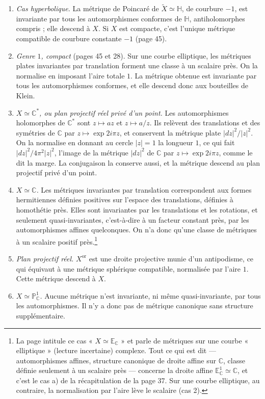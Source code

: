 \documentclass[11pt,a4paper]{article}
\begin{document}
\begin{enumerate}
  \item \emph{Cas hyperbolique.} La métrique de Poincaré de $\widetilde{X}
  \simeq \mathbb{H}$, de courbure $-1$, est invariante par tous les
  automorphismes conformes de $\mathbb{H}$, antiholomorphes compris ; elle
  descend à $X$. Si $X$ est compacte, c'est l'unique métrique compatible de
  courbure constante $-1$ (page 45).
  \item \emph{Genre $1$, compact} (pages 45 et 28). Sur une courbe elliptique,
  les métriques plates invariantes par translation forment une classe à un
  scalaire près. On la normalise en imposant l'aire totale $1$. La métrique
  obtenue est invariante par tous les automorphismes conformes, et elle
  descend donc aux bouteilles de Klein.
  \item[2')] \emph{$X \simeq \mathbb{C}^{*}$, ou plan projectif réel privé d'un
  point.} Les automorphismes holomorphes de $\mathbb{C}^{*}$ sont
  $z \mapsto az$ et $z \mapsto a/z$. Ils relèvent des translations et des
  symétries de $\mathbb{C}$ par $z \mapsto \exp 2i\pi z$, et conservent la
  métrique plate $|dz|^{2}/|z|^{2}$. On la normalise en donnant au cercle
  $|z| = 1$ la longueur $1$, ce qui fait
  $|dz|^{2}/4\pi^{2}|z|^{2}$, l'image de la métrique $|dz|^{2}$ de
  $\mathbb{C}$ par $z \mapsto \exp 2i\pi z$, comme le dit la marge. La
  conjugaison la conserve aussi, et la métrique descend au plan projectif
  privé d'un point.
  \item[2'')] \emph{$X \simeq \mathbb{C}$.} Les métriques invariantes par
  translation correspondent aux formes hermitiennes définies positives sur
  l'espace des translations, définies à homothétie près. Elles sont
  invariantes par les translations et les rotations, et seulement
  quasi-invariantes, c'est-à-dire à un facteur constant près, par les
  automorphismes affines quelconques. On n'a donc qu'une classe de métriques
  à un scalaire positif près.\footnote{La page intitule ce cas « $X \simeq
  \mathbb{E}_{\mathbb{C}}$ » et parle de métriques sur une courbe
  « elliptique » (lecture incertaine) complexe. Tout ce qui est dit ---
  automorphismes affines, structure canonique de droite affine sur
  $\mathbb{C}$, classe définie seulement à un scalaire près --- concerne la
  droite affine $\mathbb{E}^{1}_{\mathbb{C}} \simeq \mathbb{C}$, et c'est le
  cas a) de la récapitulation de la page 37. Sur une courbe elliptique, au
  contraire, la normalisation par l'aire lève le scalaire (cas 2).}
  \item[3)] \emph{Plan projectif réel.} $X^{\mathrm{or}}$ est une droite
  projective munie d'un antipodisme, ce qui équivaut à une métrique sphérique
  compatible, normalisée par l'aire $1$. Cette métrique descend à $X$.
  \item[3')] \emph{$X \simeq \mathbb{P}^{1}_{\mathbb{C}}$.} Aucune métrique
  n'est invariante, ni même quasi-invariante, par tous les automorphismes. Il
  n'y a donc pas de métrique canonique sans structure supplémentaire.
\end{enumerate}
\end{document}
